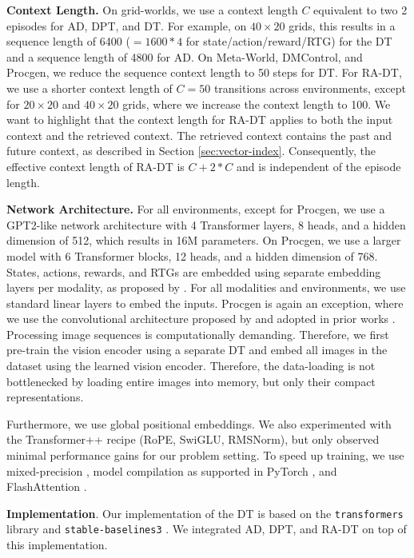 \textbf{Context Length.} 
On grid-worlds, we use a context length $C$ equivalent to two 2 episodes for AD, DPT, and DT. 
For example, on $40\times20$ grids, this results in a sequence length of 6400 ($=1600 * 4$ for state/action/reward/RTG) for the DT and a sequence length of 4800 for AD.
On Meta-World, DMControl, and Procgen, we reduce the sequence context length to 50 steps for DT. 
For RA-DT, we use a shorter context length of $C=50$ transitions across environments, except for $20\times20$ and  $40\times20$ grids, where we increase the context length to 100.
We want to highlight that the context length for RA-DT applies to both the input context and the retrieved context. 
The retrieved context contains the past and future context, as described in Section \ref{sec:vector-index}. 
Consequently, the effective context length of RA-DT is $C+2*C$ and is independent of the episode length. 

\textbf{Network Architecture.} 
For all environments, except for Procgen, we use a GPT2-like network architecture \citep{Radford:19} with 4 Transformer layers, 8 heads, and a hidden dimension of 512, which results in 16M parameters.
On Procgen, we use a larger model with 6 Transformer blocks, 12 heads, and a hidden dimension of 768.
States, actions, rewards, and RTGs are embedded using separate embedding layers per modality, as proposed by \citet{Chen:21}.
For all modalities and environments, we use standard linear layers to embed the inputs. 
Procgen is again an exception, where we use the convolutional architecture proposed by \citet{Espeholt:18} and adopted in prior works \citep{Cobbe:20,Schmidt:21,Schwarzer:23}. 
Processing image sequences is computationally demanding. 
Therefore, we first pre-train the vision encoder using a separate DT and embed all images in the dataset using the learned vision encoder. 
Therefore, the data-loading is not bottlenecked by loading entire images into memory, but only their compact representations.

Furthermore, we use global positional embeddings.
We also experimented with the Transformer++ recipe (RoPE, SwiGLU, RMSNorm), but only observed minimal performance gains for our problem setting.
To speed up training, we use mixed-precision \cite{micikevicius2017mixed}, model compilation as supported in PyTorch \citep{Paszke:19}, and FlashAttention \citep{Dao:23}. 

\textbf{Implementation}. 
Our implementation of the DT is based on the \texttt{transformers} library \citep{Wolf:20} and \texttt{stable-baselines3} \citep{Raffin:21}.
We integrated AD, DPT, and RA-DT on top of this implementation. 

